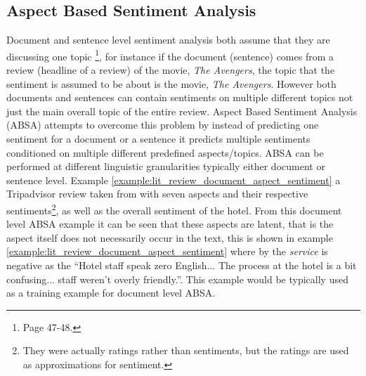 \subsection{Aspect Based Sentiment Analysis}
Document and sentence level sentiment analysis both assume that they are discussing one topic \citep{liu2015sentiment}\footnote{Page 47-48.}, for instance if the document (sentence) comes from a review (headline of a review) of the movie, \textit{The Avengers}, the topic that the sentiment is assumed to be about is the movie, \textit{The Avengers}. However both documents and sentences can contain sentiments on multiple different topics not just the main overall topic of the entire review. Aspect Based Sentiment Analysis (ABSA) attempts to overcome this problem by instead of predicting one sentiment for a document or a sentence it predicts multiple sentiments conditioned on multiple different predefined aspects/topics. ABSA can be performed at different linguistic granularities typically either document or sentence level. Example \ref{example:lit_review_document_aspect_sentiment} a Tripadvisor review taken from \citet{Wang2010LatentAR} with seven aspects and their respective sentiments\footnote{They were actually ratings rather than sentiments, but the ratings are used as approximations for sentiment.}, as well as the overall sentiment of the hotel. From this document level ABSA example it can be seen that these aspects are latent, that is the aspect itself does not necessarily occur in the text, this is shown in example \ref{example:lit_review_document_aspect_sentiment} where by the \textit{service} is negative as the ``Hotel staff speak zero English... The process at the hotel is a bit confusing... staff weren't overly friendly.''. This example would be typically used as a training example for document level ABSA.  



